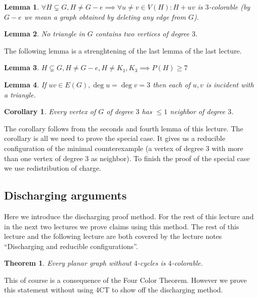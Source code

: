 \documentclass{article}
\newtheorem*{theorem}{Theorem}
\newtheorem*{lemma}{Lemma}
\newtheorem*{corollary}{Corollary}
\begin{document}
\begin{lemma}
	$\forall H \subsetneq G, H \neq G - e \implies \forall u \neq v \in
	V(H): H + uv$ is $3$-colorable (by $G - e$ we mean a graph obtained by
	deleting any edge from $G$).
\end{lemma}

\begin{lemma}
	No triangle in $G$ contains two vertices of degree $3$.
\end{lemma}

\noindent
The following lemma is a strenghtening of the last lemma of the last lecture.

\begin{lemma}
	$H \subsetneq G, H \neq G - e, H \neq K_1, K_3 \implies P(H) \ge 7$
\end{lemma}

\begin{lemma}
	If $uv \in E(G), \deg u = \deg v = 3$ then each of $u,v$ is incident
	with a triangle.
\end{lemma}

\begin{corollary}
	Every vertex of $G$ of degree $3$ has $\le 1$ neighbor of degree $3$.
\end{corollary}

\noindent
The corollary follows from the seconds and fourth lemma of this lecture. The
corollary is all we need to prove the special case. It gives us a reducible
configuration of the minimal counterexample (a vertex of degree 3 with more
than one vertex of degree 3 as neighbor). To finish the proof of the special
case we use redistribution of charge.

\subsection*{Discharging arguments}
Here we introduce the discharging proof method. For the rest of this lecture
and in the next two lectures we prove claims using this method. The rest of
this lecture and the following lecture are both covered by the lecture notes
\enquote{Discharging and reducible configurations}.

\begin{theorem}
	Every planar graph without $4$-cycles is $4$-colorable.
\end{theorem}

\noindent
This of course is a consequence of the Four Color Theorem. However we prove
this statement without using 4CT to show off the discharging method.
\end{document}
